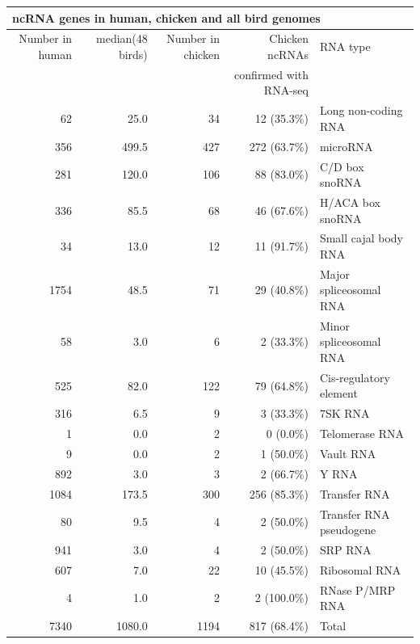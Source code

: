 \documentclass[10pt]{bmc_article}
\newenvironment{bmcformat}{\begin{raggedright}\baselineskip20pt\sloppy\setboolean{publ}{false}}{\end{raggedright}\baselineskip20pt\sloppy}
\begin{document}
\begin{bmcformat}
\begin{tabular}{|r|r|r|r|l|}
\hline 
\multicolumn{5}{|l|}{{\bf ncRNA genes in human, chicken and all bird genomes}}\\
\hline 
Number in human & median(48 birds) & Number in chicken & Chicken ncRNAs         & RNA type\\
                &                  &                   & confirmed with RNA-seq & \\
\hline
62&25.0&34&12 (35.3\%) &Long non-coding RNA\\ 
356&499.5&427&272 (63.7\%) &microRNA\\ 
281&120.0&106&88 (83.0\%) &C/D box snoRNA\\ 
336&85.5&68&46 (67.6\%) &H/ACA box snoRNA\\ 
34&13.0&12&11 (91.7\%) &Small cajal body RNA\\ 
1754&48.5&71&29 (40.8\%) &Major spliceosomal RNA\\ 
58&3.0&6&2 (33.3\%) &Minor spliceosomal RNA\\ 
525&82.0&122&79 (64.8\%) &Cis-regulatory element\\ 
316&6.5&9&3 (33.3\%) &7SK RNA\\ 
1&0.0&2&0 (0.0\%) &Telomerase RNA\\ 
9&0.0&2&1 (50.0\%) &Vault RNA\\ 
892&3.0&3&2 (66.7\%) &Y RNA\\ 
1084&173.5&300&256 (85.3\%) &Transfer RNA\\ 
80&9.5&4&2 (50.0\%) &Transfer RNA pseudogene\\ 
941&3.0&4&2 (50.0\%) &SRP RNA\\ 
607&7.0&22&10 (45.5\%) &Ribosomal RNA\\ 
4&1.0&2&2 (100.0\%) &RNase P/MRP RNA\\ 
\hline
7340&1080.0&1194&817 (68.4\%) &Total\\ 
\hline
\end{tabular}

\end{bmcformat}
\end{document}
